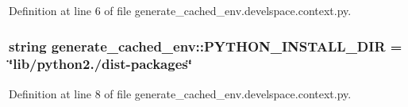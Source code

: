 \-Definition at line 6 of file generate\-\_\-cached\-\_\-env.\-develspace.\-context.\-py.

\subsubsection[{\-P\-Y\-T\-H\-O\-N\-\_\-\-I\-N\-S\-T\-A\-L\-L\-\_\-\-D\-I\-R}]{\setlength{\rightskip}{0pt plus 5cm}string {\bf generate\-\_\-cached\-\_\-env\-::\-P\-Y\-T\-H\-O\-N\-\_\-\-I\-N\-S\-T\-A\-L\-L\-\_\-\-D\-I\-R} = \char`\"{}lib/python2./dist-\/packages\char`\"{}}\label{namespacegenerate__cached__env_a66c516fcf05ea353fc8b0881f150d624}


\-Definition at line 8 of file generate\-\_\-cached\-\_\-env.\-develspace.\-context.\-py.

